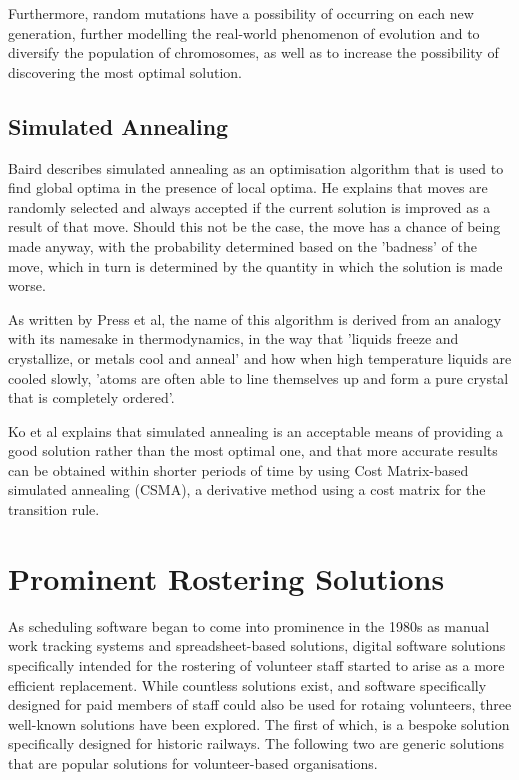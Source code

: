 Furthermore, random mutations have a possibility of occurring on each new generation, further modelling the real-world phenomenon of evolution and to diversify the population of chromosomes, as well as to increase the possibility of discovering the most optimal solution. \cite{AUGUSTINE2009}

\subsection{Simulated Annealing}
Baird describes simulated annealing as an optimisation algorithm that is used to find global optima in the presence of local optima. He explains that moves are randomly selected and always accepted if the current solution is improved as a result of that move. Should this not be the case, the move has a chance of being made anyway, with the probability determined based on the 'badness' of the move, which in turn is determined by the quantity in which the solution is made worse. \cite{Baird1998}

As written by Press et al, the name of this algorithm is derived from an analogy with its namesake in thermodynamics, in the way that 'liquids freeze and crystallize, or metals cool and anneal' and how when high temperature liquids are cooled slowly, 'atoms are often able to line themselves up and form a pure crystal that is completely ordered'. \cite{Press:1992:NRC:148286}

Ko et al explains that simulated annealing is an acceptable means of providing a good solution rather than the most optimal one, and that more accurate results can be obtained within shorter periods of time by using Cost Matrix-based simulated annealing (CSMA), a derivative method using a cost matrix for the transition rule. \cite{ko2013efficient}

\section{Prominent Rostering Solutions}
As scheduling software began to come into prominence in the 1980s as manual work tracking systems and spreadsheet-based solutions, digital software solutions specifically intended for the rostering of volunteer staff started to arise as a more efficient replacement. While countless solutions exist, and software specifically designed for paid members of staff could also be used for rotaing volunteers, three well-known solutions have been explored. The first of which, is a bespoke solution specifically designed for historic railways. The following two are generic solutions that are popular solutions for volunteer-based organisations.

